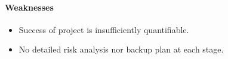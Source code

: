 \paragraph{Weaknesses}
\begin{itemize}
    \item Success of project is insufficiently quantifiable.
    \item No detailed risk analysis nor backup plan at each stage.
\end{itemize}
